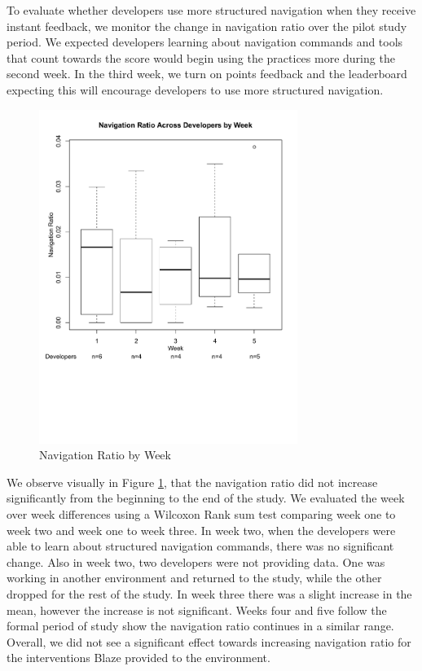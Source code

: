 \documentclass{sig-alternate}
\begin{document}
To evaluate whether developers use more structured navigation when they receive instant feedback, we monitor the change in navigation ratio over the pilot study period.   We expected developers learning about navigation commands and tools that count towards the score would begin using the practices more during the second week.  In the third week, we turn on points feedback and the leaderboard expecting this will encourage developers to use more structured navigation.  

\begin{figure}
	\includegraphics[width=3.3in]{navratioboxplot_ann.pdf}
	\caption{Navigation Ratio by Week}
	\label{fig:navigationaverage}
\end{figure}

We observe visually in Figure \ref{fig:navigationaverage}, that the navigation ratio did not increase significantly from the beginning to the end of the study.  We evaluated the week over week differences using a Wilcoxon Rank sum test \cite{RefWorks:118} comparing week one to week two and week one to week three.    In week two, when the developers were able to learn about structured navigation commands, there was no significant change.  Also in week two, two developers were not providing data.  One was working in another environment and returned to the study, while the other dropped for the rest of the study.  In week three there was a slight increase in the mean, however the increase is not significant.  Weeks four and five follow the formal period of study show the navigation ratio continues in a similar range.  Overall, we did not see a significant effect towards increasing navigation ratio for the interventions Blaze provided to the environment.    
\end{document}
